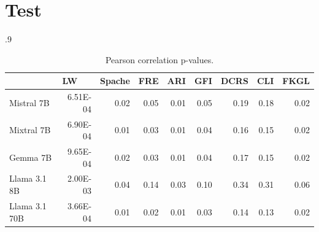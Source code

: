 \documentclass{article}
\begin{document}
\section{Test}

\begin{table}[!htb]
\centering
    \begin{subtable}{.9\textwidth}
        \centering \footnotesize
        \begin{tabular}{l|rrrrrrrr}
         & \multicolumn{1}{l}{LW} & \multicolumn{1}{l}{Spache} & \multicolumn{1}{l}{FRE} & \multicolumn{1}{l}{ARI} & \multicolumn{1}{l}{GFI} & \multicolumn{1}{l}{DCRS} & \multicolumn{1}{l}{CLI} & \multicolumn{1}{l}{FKGL} \\ \hline
        Mistral 7B & \cellcolor[HTML]{B7E1CD}6.51E-04 & \cellcolor[HTML]{B7E1CD}0.02 & \cellcolor[HTML]{B7E1CD}0.05 & \cellcolor[HTML]{B7E1CD}0.01 & \cellcolor[HTML]{B7E1CD}0.05 & 0.19 & 0.18 & \cellcolor[HTML]{B7E1CD}0.02 \\
        Mixtral 7B & \cellcolor[HTML]{B7E1CD}6.90E-04 & \cellcolor[HTML]{B7E1CD}0.01 & \cellcolor[HTML]{B7E1CD}0.03 & \cellcolor[HTML]{B7E1CD}0.01 & \cellcolor[HTML]{B7E1CD}0.04 & 0.16 & 0.15 & \cellcolor[HTML]{B7E1CD}0.02 \\
        Gemma 7B & \cellcolor[HTML]{B7E1CD}9.65E-04 & \cellcolor[HTML]{B7E1CD}0.02 & \cellcolor[HTML]{B7E1CD}0.03 & \cellcolor[HTML]{B7E1CD}0.01 & \cellcolor[HTML]{B7E1CD}0.04 & 0.17 & 0.15 & \cellcolor[HTML]{B7E1CD}0.02 \\
        Llama 3.1 8B & \cellcolor[HTML]{B7E1CD}2.00E-03 & \cellcolor[HTML]{B7E1CD}0.04 & 0.14 & \cellcolor[HTML]{B7E1CD}0.03 & 0.10 & 0.34 & 0.31 & 0.06 \\
        Llama 3.1 70B & \cellcolor[HTML]{B7E1CD}3.66E-04 & \cellcolor[HTML]{B7E1CD}0.01 & \cellcolor[HTML]{B7E1CD}0.02 & \cellcolor[HTML]{B7E1CD}0.01 & \cellcolor[HTML]{B7E1CD}0.03 & 0.14 & 0.13 & \cellcolor[HTML]{B7E1CD}0.02 \\
        \end{tabular}
        \caption{Pearson correlation p-values.}\label{subtab:pearson-pval}
    \end{subtable}%
    

\end{table}
\end{document}
